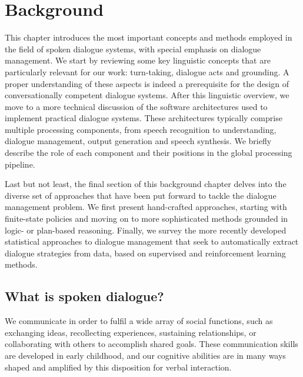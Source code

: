 
\chapter{Background}
\label{chap:background}

This chapter introduces the most important concepts and methods employed in the field of spoken dialogue systems, with special emphasis on dialogue management.  We start by reviewing some key linguistic concepts that are particularly relevant for our work: turn-taking, dialogue acts and grounding.  A proper understanding of these aspects is indeed a prerequisite for the design of conversationally competent dialogue systems. After this linguistic overview, we move to a more technical discussion of the software architectures used to implement practical dialogue systems.  These architectures typically comprise multiple processing components, from speech recognition to understanding, dialogue management, output generation and speech synthesis.  We briefly describe the role of each component and their positions in the global processing pipeline. 

Last but not least, the final section of this background chapter delves into the diverse set of approaches that have been put forward to tackle the dialogue management problem.  We first present hand-crafted approaches, starting with finite-state policies and moving on to more sophisticated methods grounded in logic- or plan-based reasoning.  Finally, we survey the more recently developed statistical approaches to dialogue management that seek to automatically extract dialogue strategies from data, based on supervised and reinforcement learning methods.

\section{What is spoken dialogue?}

We communicate in order to fulfil a wide array of social functions, such as exchanging ideas, recollecting experiences,  sustaining relationships, or collaborating with others to accomplish shared goals. These communication skills are developed in early childhood, and our cognitive abilities are in many ways shaped and amplified by this disposition for verbal interaction.  

